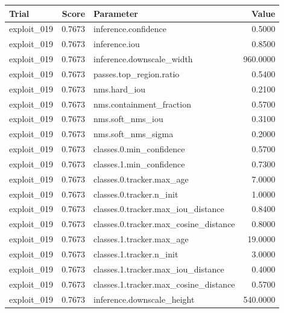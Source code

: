 \begin{tabular}{lrlr}
\toprule
Trial & Score & Parameter & Value \\
\midrule
exploit_019 & 0.7673 & inference.confidence & 0.5000 \\
exploit_019 & 0.7673 & inference.iou & 0.8500 \\
exploit_019 & 0.7673 & inference.downscale_width & 960.0000 \\
exploit_019 & 0.7673 & passes.top_region.ratio & 0.5400 \\
exploit_019 & 0.7673 & nms.hard_iou & 0.2100 \\
exploit_019 & 0.7673 & nms.containment_fraction & 0.5700 \\
exploit_019 & 0.7673 & nms.soft_nms_iou & 0.3100 \\
exploit_019 & 0.7673 & nms.soft_nms_sigma & 0.2000 \\
exploit_019 & 0.7673 & classes.0.min_confidence & 0.5700 \\
exploit_019 & 0.7673 & classes.1.min_confidence & 0.7300 \\
exploit_019 & 0.7673 & classes.0.tracker.max_age & 7.0000 \\
exploit_019 & 0.7673 & classes.0.tracker.n_init & 1.0000 \\
exploit_019 & 0.7673 & classes.0.tracker.max_iou_distance & 0.8400 \\
exploit_019 & 0.7673 & classes.0.tracker.max_cosine_distance & 0.8000 \\
exploit_019 & 0.7673 & classes.1.tracker.max_age & 19.0000 \\
exploit_019 & 0.7673 & classes.1.tracker.n_init & 3.0000 \\
exploit_019 & 0.7673 & classes.1.tracker.max_iou_distance & 0.4000 \\
exploit_019 & 0.7673 & classes.1.tracker.max_cosine_distance & 0.5700 \\
exploit_019 & 0.7673 & inference.downscale_height & 540.0000 \\
\bottomrule
\end{tabular}
